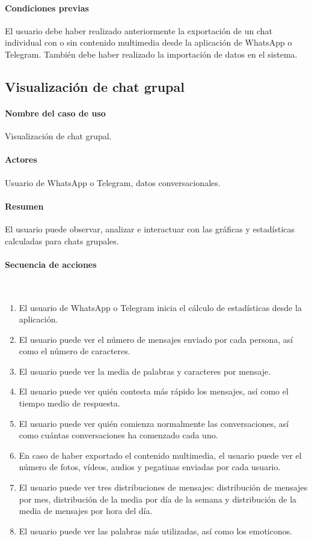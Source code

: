 \paragraph{Condiciones previas} El usuario debe haber realizado anteriormente la exportación de un chat individual con o sin contenido multimedia desde la aplicación de WhatsApp o Telegram. También debe haber realizado la importación de datos en el sistema.

\subsection{Visualización de chat grupal}

\paragraph{Nombre del caso de uso} Visualización de chat grupal.
\paragraph{Actores} Usuario de WhatsApp o Telegram, datos conversacionales.
\paragraph{Resumen} El usuario puede observar, analizar e interactuar con las gráficas y estadísticas calculadas para chats grupales.
\paragraph{Secuencia de acciones}\mbox{}\\

\begin{enumerate}
	\item El usuario de WhatsApp o Telegram inicia el cálculo de estadísticas desde la aplicación.
	\item El usuario puede ver el número de mensajes enviado por cada persona, así como el número de caracteres.
	\item El usuario puede ver la media de palabras y caracteres por mensaje.
	\item El usuario puede ver quién contesta más rápido los mensajes, así como el tiempo medio de respuesta.
	\item El usuario puede ver quién comienza normalmente las conversaciones, así como cuántas conversaciones ha comenzado cada uno.
	\item En caso de haber exportado el contenido multimedia, el usuario puede ver el número de fotos, vídeos, audios y pegatinas enviadas por cada usuario.
	\item El usuario puede ver tres distribuciones de mensajes: distribución de mensajes por mes, distribución de la media por día de la semana y distribución de la media de mensajes por hora del día.
	\item El usuario puede ver las palabras más utilizadas, así como los emoticonos.
\end{enumerate}

